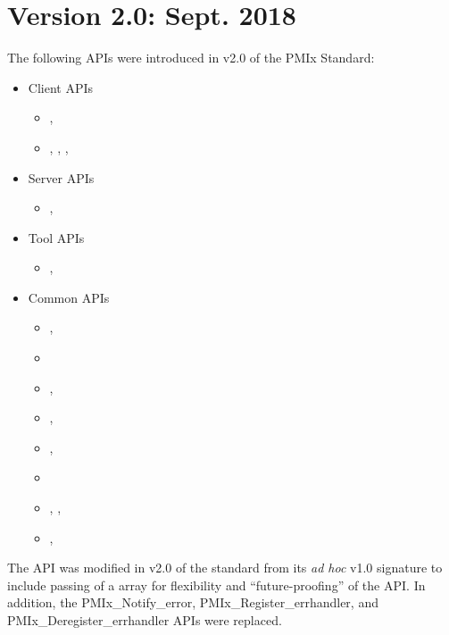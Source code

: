 \section{Version 2.0: Sept. 2018}

The following \acp{API} were introduced in v2.0 of the PMIx Standard:

\begin{itemize}
\item Client APIs
\begin{itemize}
\item {}, 
\item {}, , , 
\end{itemize}
\item Server APIs
\begin{itemize}
\item {}, 
\end{itemize}
\item Tool APIs
\begin{itemize}
\item {}, 
\end{itemize}
\item Common APIs
\begin{itemize}
\item {}, 
\item {}
\item {}, 
\item {}, 
\item {}, 
\item {}
\item {}, , 
\item {}, 
\end{itemize}
\end{itemize}

The  \ac{API} was modified in v2.0 of the standard from its \textit{ad hoc} v1.0 signature to include passing of a  array for flexibility and ``future-proofing'' of the \ac{API}.
In addition, the PMIx_Notify_error, PMIx_Register_errhandler, and PMIx_Deregister_errhandler \acp{API} were replaced.

